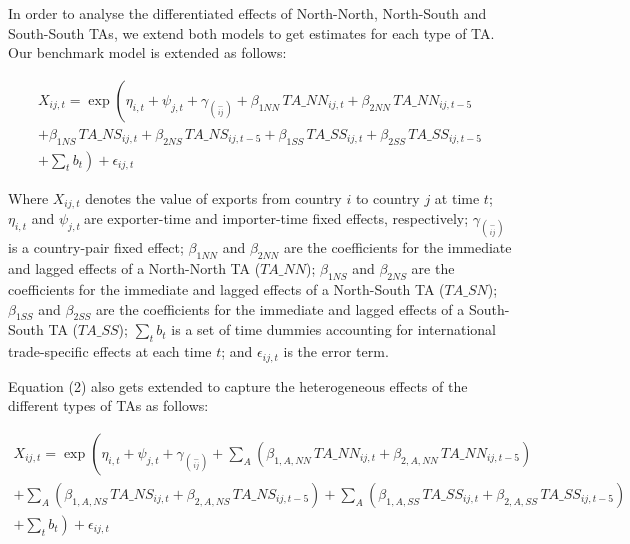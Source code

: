 %
In order to analyse the differentiated effects of North-North,
North-South and South-South TAs, we extend both models to get estimates
for each type of TA. Our benchmark model is extended as follows:

\begin{multline}
    X_{ij,t} = \exp\left(\eta_{i,t} + \psi_{j,t} + \gamma_{\binom{-}{ij}} + \beta_{1NN} \, TA\_NN_{ij,t} + \beta_{2NN} \, TA\_NN_{ij,t-5} \right. \\
    + \beta_{1NS} \, TA\_NS_{ij,t} + \beta_{2NS} \, TA\_NS_{ij,t-5} + \beta_{1SS} \, TA\_SS_{ij,t} + \beta_{2SS} \, TA\_SS_{ij,t-5} \\
    + \left. \sum_{t} b_{t} \right) + \epsilon_{ij,t}
\end{multline}

Where \(X_{ij,t}\)\hspace{0pt} denotes the value of exports from country
\(i\) to country \(j\) at time \(t\); \(\eta_{i,t}\) and
\(\psi_{j,t}\ \)are exporter-time and importer-time fixed effects,
respectively; \(\gamma_{\binom{-}{ij}}\) is a country-pair fixed effect;
\hspace{0pt}\(\beta_{1NN}\) and \(\beta_{2NN}\) are the coefficients for
the immediate and lagged effects of a North-North TA (\(TA\_ NN\));
\hspace{0pt}\hspace{0pt}\(\beta_{1NS}\) and \(\beta_{2NS}\) are the
coefficients for the immediate and lagged effects of a North-South TA
(\(TA\_ SN\)); \hspace{0pt}\hspace{0pt}\(\beta_{1SS}\) and
\(\beta_{2SS}\) are the coefficients for the immediate and lagged
effects of a South-South TA (\(TA\_ SS\)); \(\sum_{t}^{}b_{t}\) is a set
of time dummies accounting for international trade-specific effects at
each time \(t\); and \(\epsilon_{ij,t}\) is the error term.

Equation (2) also gets extended to capture the heterogeneous effects of
the different types of TAs as follows:

\begin{multline}
    X_{ij,t} = \exp\left(\eta_{i,t} + \psi_{j,t} + \gamma_{\binom{-}{ij}} + \sum_{A}\left(\beta_{1,A,NN} \, TA\_NN_{ij,t} + \beta_{2,A,NN} \, TA\_NN_{ij,t-5}\right) \right. \\
    + \sum_{A}\left(\beta_{1,A,NS} \, TA\_NS_{ij,t} + \beta_{2,A,NS} \, TA\_NS_{ij,t-5}\right) + \sum_{A}\left(\beta_{1,A,SS} \, TA\_SS_{ij,t} + \beta_{2,A,SS} \, TA\_SS_{ij,t-5}\right) \\
    + \left. \sum_{t} b_{t} \right) + \epsilon_{ij,t}
\end{multline}

